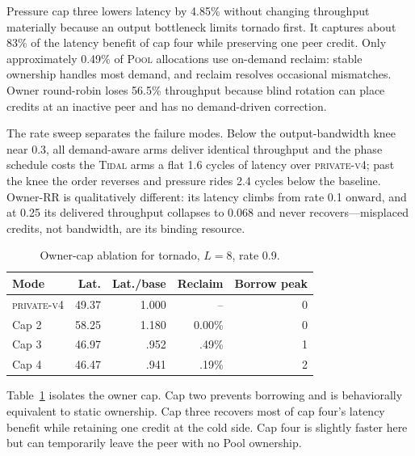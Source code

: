 \documentclass[10pt,twocolumn]{article}
\newcommand{\system}{\textsc{Tidal}\xspace}
\newcommand{\pool}{\textsc{Pool}\xspace}
\newcommand{\privatefour}{\textsc{private-v4}\xspace}
\begin{document}
Pressure cap three lowers latency by 4.85\% without changing throughput
materially because an output bottleneck limits tornado first. It captures
about 83\% of the latency benefit of cap four while preserving one peer
credit. Only approximately 0.49\% of \pool allocations use on-demand reclaim:
stable ownership handles most demand, and reclaim resolves occasional
mismatches. Owner round-robin loses 56.5\% throughput because blind rotation
can place credits at an inactive peer and has no demand-driven correction.

The rate sweep separates the failure modes. Below the output-bandwidth
knee near 0.3, all demand-aware arms deliver identical throughput and the
phase schedule costs the \system arms a flat 1.6 cycles of latency over
\privatefour; past the knee the order reverses and pressure rides 2.4
cycles below the baseline. Owner-RR is qualitatively different: its
latency climbs from rate 0.1 onward, and at 0.25 its delivered throughput
collapses to 0.068 and never recovers---misplaced credits, not bandwidth,
are its binding resource.

\begin{table}[t]
\centering
\caption{Owner-cap ablation for tornado, $L=8$, rate 0.9.}
\label{tab:cap}
\small
\setlength{\tabcolsep}{4pt}
\begin{tabular}{lrrrr}
\toprule
Mode & Lat. & Lat./base & Reclaim & Borrow peak\\
\midrule
\privatefour & 49.37 & 1.000 & -- & 0\\
Cap 2 & 58.25 & 1.180 & 0.00\% & 0\\
Cap 3 & 46.97 & .952 & .49\% & 1\\
Cap 4 & 46.47 & .941 & .19\% & 2\\
\bottomrule
\end{tabular}
\end{table}

Table~\ref{tab:cap} isolates the owner cap. Cap two prevents borrowing and
is behaviorally equivalent to static ownership. Cap three recovers most of
cap four's latency benefit while retaining one credit at the cold side. Cap
four is slightly faster here but can temporarily leave the peer with no Pool
ownership.
\end{document}
